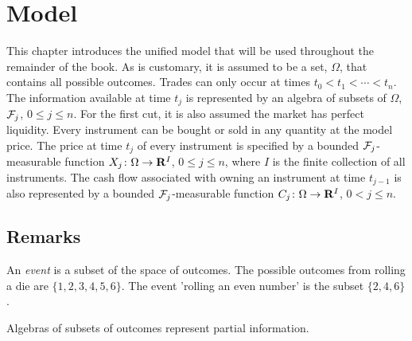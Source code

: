 \chapter{Model}

This chapter introduces the unified model that will be used throughout
the remainder of the book. As is customary, it is assumed to be a set,
$\Omega$, that contains all possible outcomes.  Trades can only occur
at times $t_0 < t_1 < \cdots < t_n$. The information available at time
$t_j$ is represented by an algebra of subsets of $\Omega$, $\mathcal{F}_j$, $0\le
j\le n$.  For the first cut, it is also assumed the market has perfect
liquidity. Every instrument can be bought or sold in any quantity at the
model price.  The price at time $t_j$ of every instrument is specified by
a bounded $\mathcal{F}_j$-measurable function $X_j\colon\Omega\to{\bf{R}}^I$, $0\le j\le
n$, where $I$ is the finite collection of all instruments. The cash flow
associated with owning an instrument at time $t_{j-1}$ is also represented
by a bounded $\mathcal{F}_j$-measurable function $C_j\colon\Omega\to{\bf{R}}^I$,
$0<j\le n$.

\section{Remarks}
An {\em event} is a subset of the space of outcomes. The possible
outcomes from rolling a die are $\{1,2,3,4,5,6\}$. The event 'rolling
an even number' is the subset $\{2,4,6\}$.

Algebras of subsets of outcomes represent partial information.
